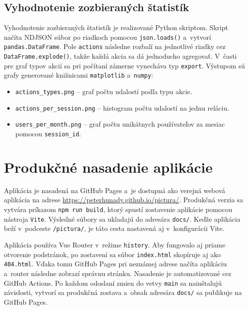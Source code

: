 \subsection{Vyhodnotenie zozbieraných štatistík}

Vyhodnotenie zozbieraných štatistík je realizované Python skriptom. Skript načíta NDJSON súbor po riadkoch pomocou \texttt{json.loads()} a~vytvorí \texttt{pandas.DataFrame}. Pole \texttt{actions} následne rozbalí na jednotlivé riadky cez \texttt{DataFrame.explode()}, takže každá akcia sa dá jednoducho agregovať. V~časti pre graf typov akcií sa pri počítaní zámerne vynecháva typ \texttt{export}. Výstupom sú grafy generované knižnicami \texttt{matplotlib} a~\texttt{numpy}:
\begin{itemize}
    \item \texttt{actions\_types.png} – graf počtu udalostí podľa typu akcie.
    \item \texttt{actions\_per\_session.png} – histogram počtu udalostí na jednu reláciu.
    \item \texttt{users\_per\_month.png} – graf počtu unikátnych používateľov za mesiac pomocou \texttt{session\_id}.
\end{itemize}

\section{Produkčné nasadenie aplikácie}

Aplikácia je nasadená na GitHub Pages a~je dostupná ako verejná webová aplikácia na adrese \url{https://peterhunady.github.io/pictura/}. Produkčná verzia sa vytvára príkazom \texttt{npm run build}, ktorý spustí zostavenie aplikácie pomocou nástroja \texttt{Vite}. Výsledné súbory sa ukladajú do adresára \texttt{docs/}. Keďže aplikácia beží v~podceste \texttt{/pictura/}, je táto cesta nastavená aj v~konfigurácii Vite.

Aplikácia používa Vue Router v~režime \texttt{history}. Aby fungovalo aj priame otvorenie podstránok, po zostavení sa súbor \texttt{index.html} skopíruje aj ako \texttt{404.html}. Vďaka tomu GitHub Pages pri neznámej adrese načíta aplikáciu a~router následne zobrazí správnu stránku. Nasadenie je automatizované cez GitHub Actions. Po každom odoslaní zmien do vetvy \texttt{main} sa nainštalujú závislosti, vytvorí sa produkčná zostava a~obsah adresára \texttt{docs/} sa publikuje na GitHub Pages.

